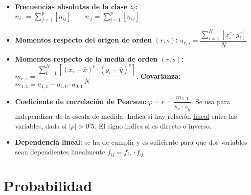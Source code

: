 \documentclass[a4paper, twocolumn, 10pt]{article}
\begin{document}
\begin{itemize}
	\item \textbf{Frecuencias absolutas de la clase $z_i$:} \\ $n_{i\cdot} = \sum\limits_{j=1}^p\left[n_{ij}\right] \qquad n_{\cdot j} = \sum\limits_{i=1}^p\left[n_{ij}\right]$
	\item \textbf{Momentos respecto del origen de orden $(r,s)$:} $a_{r,s} = \dfrac{\sum\limits_{i=1}^N\left[x_i^r\cdot y_i^s\right]}{N}$
	\item \textbf{Momentos respecto de la media de orden $(r,s)$:} $m_{r,s} = \dfrac{\sum\limits_{i=1}^N\left[\left(x_i-\bar{x}\right)^r\cdot\left( y_i-\bar{y}\right)^s\right]}{N}$. \textbf{Covarianza:} $m_{1,1} = a_{1,1} - a_{1,0}\cdot a_{0,1}$
	\item \textbf{Coeficiente de correlación de Pearson:} $\rho = r = \dfrac{m_{1,1}}{s_x\cdot s_y}$. Se usa para independizar de la escala de medida. Indica si hay relación \underline{lineal} entre las variables, dada si $|\rho| >0'5$. El signo indica si es directo o inverso.
	\item \textbf{Dependencia lineal:} se ha de cumplir y es suficiente para que dos variables sean dependientes linealmente $f_{ij} = f_{i\cdot} \cdot f_{\cdot j}$
\end{itemize}

\section{Probabilidad}
\end{document}
